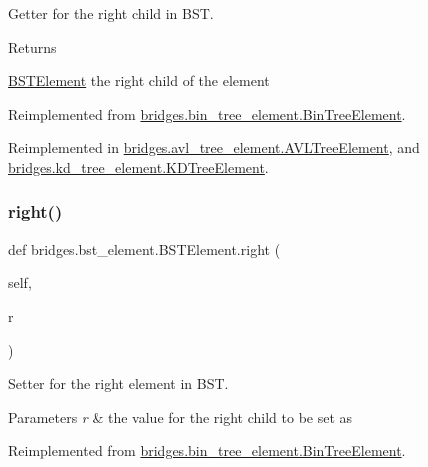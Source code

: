 Getter for the right child in B\+ST. 

\begin{DoxyReturn}{Returns}


\mbox{\hyperlink{classbridges_1_1bst__element_1_1_b_s_t_element}{B\+S\+T\+Element}} the right child of the element 
\end{DoxyReturn}


Reimplemented from \mbox{\hyperlink{classbridges_1_1bin__tree__element_1_1_bin_tree_element_adb7eaa3c67233aa5c368e8907043f451}{bridges.\+bin\+\_\+tree\+\_\+element.\+Bin\+Tree\+Element}}.



Reimplemented in \mbox{\hyperlink{classbridges_1_1avl__tree__element_1_1_a_v_l_tree_element_aaab3b79617e7e503b1a7c28069d1eb15}{bridges.\+avl\+\_\+tree\+\_\+element.\+A\+V\+L\+Tree\+Element}}, and \mbox{\hyperlink{classbridges_1_1kd__tree__element_1_1_k_d_tree_element_acbcfa46ba613daaf922d8b632b795a86}{bridges.\+kd\+\_\+tree\+\_\+element.\+K\+D\+Tree\+Element}}.

\mbox{\label{classbridges_1_1bst__element_1_1_b_s_t_element_a978ae0db366dee59703ed266eebca0e9}} 
\subsubsection{\texorpdfstring{right()}{right()}\hspace{0.1cm}{\footnotesize\ttfamily [2/2]}}
{\footnotesize\ttfamily def bridges.\+bst\+\_\+element.\+B\+S\+T\+Element.\+right (\begin{DoxyParamCaption}\item[{}]{self,  }\item[{}]{r }\end{DoxyParamCaption})}



Setter for the right element in B\+ST. 


\begin{DoxyParams}{Parameters}
{\em r} & the value for the right child to be set as \\
\hline
\end{DoxyParams}


Reimplemented from \mbox{\hyperlink{classbridges_1_1bin__tree__element_1_1_bin_tree_element_a01951f6db20fcc298311ebc1562a4da7}{bridges.\+bin\+\_\+tree\+\_\+element.\+Bin\+Tree\+Element}}.



